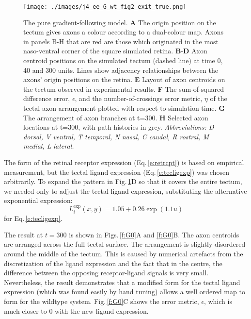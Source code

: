 \documentclass[11pt, a4paper]{article}
\begin{document}
\begin{figure}
\texttt{[image: ./images/j4\_ee\_G\_wt\_fig2\_exit\_true.png]}
\caption{The pure gradient-following model. \textbf{A} The origin position
on the tectum gives axons a colour according to a dual-colour map. Axons in
panels B-H that are red are those which originated in the most naso-ventral
corner of the square simulated retina. \textbf{B}-\textbf{D} Axon centroid
positions on the simulated tectum (dashed line) at time 0, 40 and 300
units. Lines show adjacency relationships between the axons' origin positions
on the retina. \textbf{E} Layout of axon centroids on the tectum observed in
experimental results. \textbf{F} The sum-of-squared difference error,
$\epsilon$, and the number-of-crossings error metric, $\eta$ of the tectal axon
arrangement plotted with respect to simulation time. \textbf{G} The
arrangement of axon branches at t=300. \textbf{H} Selected axon locations at
t=300, with path histories in grey.  \emph{Abbreviations: D dorsal, V ventral, T
temporal, N nasal, C caudal, R rostral, M medial, L lateral.}}
\label{f:G}
\end{figure}

The form of the retinal receptor expression (Eq.\,\ref{e:retrcpt}) is based on
empirical measurement, but the tectal ligand expression
(Eq.\,\ref{e:tecligexp}) was chosen arbitrarily. To expand the pattern in
Fig.\,\ref{f:G}D so that it covers the entire tectum, we needed only to
adjust the tectal ligand expression, substituting the alternative exponential
expression:
%
\begin{equation} \label{e:tecligexp2}
L_i^{\text{exp}}(x,y) = 1.05 + 0.26 \exp(1.1 u)
\end{equation}
%
for Eq.\,\ref{e:tecligexp}.

The result at $t=300$ is shown in Figs.\,\ref{f:G0}A
and \ref{f:G0}B. The axon centroids are arranged across the full tectal
surface.  The arrangement is slightly disordered around the middle of the
tectum. This is caused by numerical artefacts from the discretization of the
ligand expression and the fact that in the centre, the difference between the
opposing receptor-ligand signals is very small. Nevertheless, the result
demonstrates that a modified form for the tectal ligand expression (which was
found easily by hand tuning) allows a well ordered map to form for the
wildtype system. Fig.\,\ref{f:G0}C shows the error metric, $\epsilon$,
which is much closer to 0 with the new ligand expression.
\end{document}

